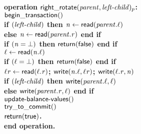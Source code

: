 \begin{figure}[h!]
{{\begin{minipage}[t]{150mm}
\begin{tabbing}
\bf{operation} $\act{right\_rotate}(\ms{parent}, \ms{left-child})_p$: \\
		 \> $\lit{begin\_transaction}()$ \\
		 \> \bf{if} $(\ms{left-child})$ \bf{then} $\ms{n} \gets \lit{read}(\ms{parent.\ell})$ \\
		 \>\> \bf{else} $\ms{n} \gets \lit{read}(\ms{parent.r})$ \bf{end if} \\
		 \> \bf{if} $(\ms{n = \bot})$ {\bf then} ${\sf return}(\lit{false})$  \bf{end if} \\
		 \> $\ms{\ell} \gets \lit{read}(\ms{n.\ell})$ \\
		 \> \bf{if} $(\ms{\ell = \bot})$ \bf{then} ${\sf return}(\lit{false})$ \bf{end if} \\
		 \> $\ms{\ell{}r} \gets \lit{read}(\ms{\ell.r})$; $\lit{write}(\ms{n.\ell}, \ms{\ell{}r})$; $\lit{write}(\ms{\ell.r}, \ms{n})$ \\
		 \> \bf{if} $(\ms{left-child})$ \bf{then} $\lit{write}(\ms{parent.\ell}, \ell)$ \\
		 \>\> \bf{else} $\lit{write}(\ms{parent.r}, \ms{\ell})$ \bf{end if} \\
		 \> $\act{update-balance-values()}$ \\%
		 \> $\lit{try\_to\_commit}()$ \\
		 \> $\sf{return}(\lit{true})$. \\
		{\bf end operation}. \\
\\



\end{tabbing}
\end{minipage}}}
\end{figure}
